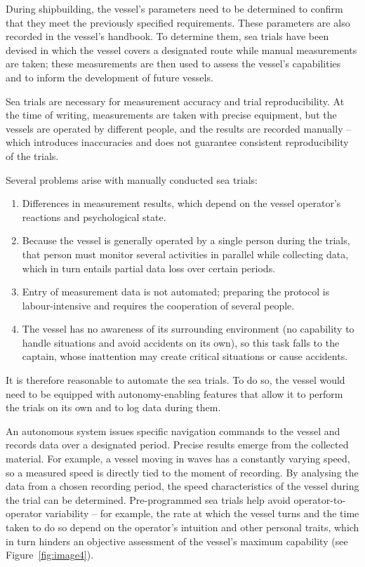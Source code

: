 
During shipbuilding, the vessel's parameters need to be determined to confirm that they meet the previously specified requirements. These parameters are also recorded in the vessel's handbook. To determine them, sea trials have been devised in which the vessel covers a designated route while manual measurements are taken; these measurements are then used to assess the vessel's capabilities and to inform the development of future vessels.

Sea trials are necessary for measurement accuracy and trial reproducibility. At the time of writing, measurements are taken with precise equipment, but the vessels are operated by different people, and the results are recorded manually -- which introduces inaccuracies and does not guarantee consistent reproducibility of the trials.

Several problems arise with manually conducted sea trials:

\begin{enumerate}
\def\labelenumi{\arabic{enumi}.}
\item
  Differences in measurement results, which depend on the vessel operator's reactions and psychological state.
\item
  Because the vessel is generally operated by a single person during the trials, that person must monitor several activities in parallel while collecting data, which in turn entails partial data loss over certain periods.
\item
  Entry of measurement data is not automated; preparing the protocol is labour-intensive and requires the cooperation of several people.
\item
  The vessel has no awareness of its surrounding environment (no capability to handle situations and avoid accidents on its own), so this task falls to the captain, whose inattention may create critical situations or cause accidents.
\end{enumerate}

It is therefore reasonable to automate the sea trials. To do so, the vessel would need to be equipped with autonomy-enabling features that allow it to perform the trials on its own and to log data during them.

An autonomous system issues specific navigation commands to the vessel and records data over a designated period. Precise results emerge from the collected material. For example, a vessel moving in waves has a constantly varying speed, so a measured speed is directly tied to the moment of recording. By analysing the data from a chosen recording period, the speed characteristics of the vessel during the trial can be determined. Pre-programmed sea trials help avoid operator-to-operator variability -- for example, the rate at which the vessel turns and the time taken to do so depend on the operator's intuition and other personal traits, which in turn hinders an objective assessment of the vessel's maximum capability \cite{ref13} (see Figure~\ref{fig:image4}).

